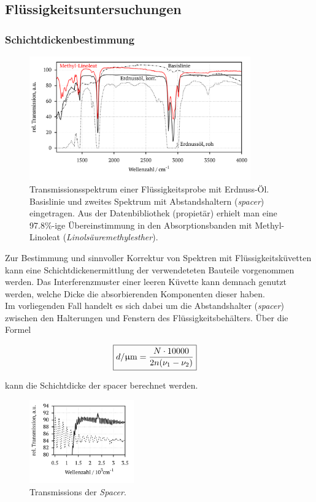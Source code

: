 \documentclass[numbers=noenddot,a4paper,10pt,twocolumn]{article}
\newcommand{\ix}[1]{_\text{#1}}
\newcommand{\tilt}[1]{\textit{#1}}
\begin{document}
		\subsection{Fl\"ussigkeitsuntersuchungen}

		\subsubsection{Schichtdickenbestimmung}

			\begin{figure}
			\centering
				\includegraphics[width=0.85\textwidth]{Gruppe2A/erdnuss.pdf}
				\caption{Transmissionsspektrum einer Fl\"ussigkeitsprobe mit Erdnuss-\"Ol. Basislinie und zweites Spektrum mit Abstandshaltern (\tilt{spacer}) eingetragen. Aus der Datenbibliothek (propiet\"ar) erhielt man eine 97.8\%-ige \"Ubereinstimmung in den Absorptionsbanden mit Methyl-Linoleat (\tilt{Linols\"auremethylesther}).} 
				\label{img:erdnuss}
			\end{figure}

		Zur Bestimmung und sinnvoller Korrektur von Spektren mit Fl\"ussigkeitsk\"uvetten kann eine Schichtdickenermittlung der verwendeteten Bauteile vorgenommen werden. Das Interferenzmuster einer leeren K\"uvette kann demnach genutzt werden, welche Dicke die absorbierenden Komponenten dieser haben.\\
		Im vorliegenden Fall handelt es sich dabei um die Abstandshalter (\tilt{spacer}) zwischen den Halterungen und Fenstern des Fl\"ussigkeitsbeh\"alters. \"Uber die Formel
		
		\begin{align}
		\Aboxed{
			d/\unit{\upmu m}=\frac{N\cdot 10000}{2n(\nu\ix{1}-\nu\ix{2})}
			}
		\end{align}
		
		kann die Schichtdicke der spacer berechnet werden.

		\begin{figure}[h]
			\centering
			\includegraphics[width=0.4\textwidth]{Gruppe2A/spacer.pdf}
			\caption{Transmissions der \tilt{Spacer}.}
			\label{img:space}
		\end{figure}
		
\end{document}
